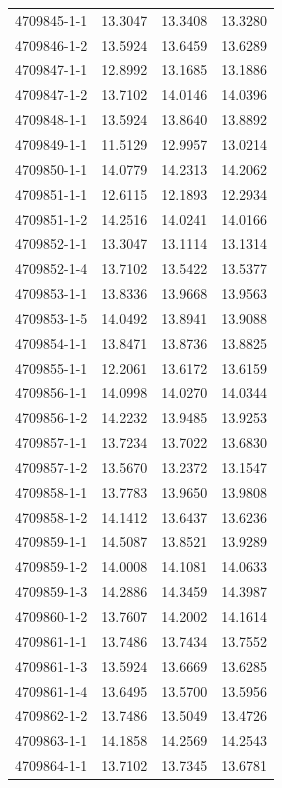 \begin{longtable}{lrrr}
4709845-1-1 & 13.3047 & 13.3408 & 13.3280 \\
4709846-1-2 & 13.5924 & 13.6459 & 13.6289 \\
4709847-1-1 & 12.8992 & 13.1685 & 13.1886 \\
4709847-1-2 & 13.7102 & 14.0146 & 14.0396 \\
4709848-1-1 & 13.5924 & 13.8640 & 13.8892 \\
4709849-1-1 & 11.5129 & 12.9957 & 13.0214 \\
4709850-1-1 & 14.0779 & 14.2313 & 14.2062 \\
4709851-1-1 & 12.6115 & 12.1893 & 12.2934 \\
4709851-1-2 & 14.2516 & 14.0241 & 14.0166 \\
4709852-1-1 & 13.3047 & 13.1114 & 13.1314 \\
4709852-1-4 & 13.7102 & 13.5422 & 13.5377 \\
4709853-1-1 & 13.8336 & 13.9668 & 13.9563 \\
4709853-1-5 & 14.0492 & 13.8941 & 13.9088 \\
4709854-1-1 & 13.8471 & 13.8736 & 13.8825 \\
4709855-1-1 & 12.2061 & 13.6172 & 13.6159 \\
4709856-1-1 & 14.0998 & 14.0270 & 14.0344 \\
4709856-1-2 & 14.2232 & 13.9485 & 13.9253 \\
4709857-1-1 & 13.7234 & 13.7022 & 13.6830 \\
4709857-1-2 & 13.5670 & 13.2372 & 13.1547 \\
4709858-1-1 & 13.7783 & 13.9650 & 13.9808 \\
4709858-1-2 & 14.1412 & 13.6437 & 13.6236 \\
4709859-1-1 & 14.5087 & 13.8521 & 13.9289 \\
4709859-1-2 & 14.0008 & 14.1081 & 14.0633 \\
4709859-1-3 & 14.2886 & 14.3459 & 14.3987 \\
4709860-1-2 & 13.7607 & 14.2002 & 14.1614 \\
4709861-1-1 & 13.7486 & 13.7434 & 13.7552 \\
4709861-1-3 & 13.5924 & 13.6669 & 13.6285 \\
4709861-1-4 & 13.6495 & 13.5700 & 13.5956 \\
4709862-1-2 & 13.7486 & 13.5049 & 13.4726 \\
4709863-1-1 & 14.1858 & 14.2569 & 14.2543 \\
4709864-1-1 & 13.7102 & 13.7345 & 13.6781 \\

\end{longtable}

